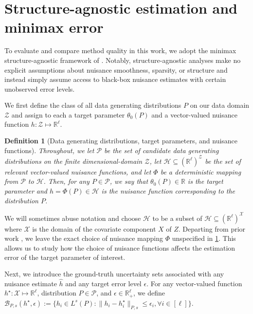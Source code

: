 \documentclass{article}
\def\gB{{\mathcal{B}}}
\def\gH{{\mathcal{H}}}
\def\gP{{\mathcal{P}}}
\def\gX{{\mathcal{X}}}
\def\gZ{{\mathcal{Z}}}
\newcommand{\R}{\mathbb{R}}
\newtheorem{definition}{Definition}[section]
\begin{document}
%
%
%

%
%
%
%
%
%
%
%
%
%
%
%
%
%

%

%
%

\section{Structure-agnostic estimation and minimax error} %
\label{sec:structure-agnostic-oracle}

To evaluate and compare method quality in this work, we adopt the minimax structure-agnostic framework of \citet{balakrishnan2023fundamental}. 
Notably, structure-agnostic analyses make no explicit assumptions about nuisance smoothness, sparsity, or structure and instead simply assume access to black-box nuisance estimates with certain unobserved error levels.
%

We first define the class of all data generating distributions $P$ on our data domain $\gZ$ and assign to each a target parameter $\theta_0(P)$ and a vector-valued nuisance function $h: \gZ\mapsto \R^\ell$.

\begin{definition}[Data generating distributions, target parameters, and nuisance functions]
    \label{def:nuisance function}
    Throughout, we let $\gP$ be the set of candidate data generating distributions on the finite dimensional-domain $\gZ$, let $\gH\subseteq\left(\R^\ell\right)^{\gZ}$ be the set of relevant vector-valued nuisance functions, and let $\Phi$ be a deterministic mapping from $\gP$ to $\gH$. Then, for any $P\in\gP$, we say that $\theta_0(P)\in\R$ is the target parameter and $h=\Phi(P)\in\gH$ is the nuisance function corresponding to the distribution $P$.
\end{definition}

We will sometimes abuse notation and choose $\gH$ to be a subset of $\gH\subseteq\left(\R^\ell\right)^{\gX}$ where $\gX$ is the domain of the covariate component $X$ of $Z$. 
Departing from prior work \citep{balakrishnan2023fundamental,jin2024structure}, we leave the exact choice of nuisance mapping $\Phi$ unspecified in \cref{def:nuisance function}. This allows us to study how the choice of nuisance functions  affects the estimation error of the target parameter of interest. 
%
 

Next, we introduce the ground-truth uncertainty sets associated with any nuisance estimate $\hat{h}$ and any target error level $\epsilon$. For any vector-valued function $h^{\star}:\gX\mapsto\R^\ell$, distribution $P\in\gP$,  and $\epsilon\in\R_+^\ell$, we define $\gB_{P,s}(h^{\star},\epsilon):=\big\{h_i\in L^s(P): \|h_i-h_i^{\star}\|_{P,s}\leq \epsilon_i, \forall i\in [\ell]\}$. %
\end{document}
